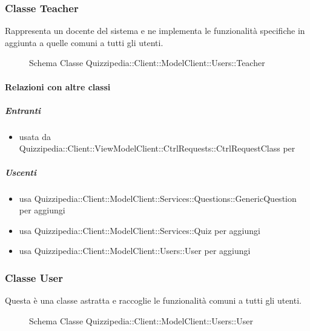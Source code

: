 \subsubsection{Classe Teacher}
Rappresenta un docente del sistema e ne implementa le funzionalità specifiche in aggiunta a quelle comuni a tutti gli utenti.
\begin{figure}[H]
\centering
\noindent{}
\caption[Schema Classe Teacher]{Schema Classe Quizzipedia::Client::ModelClient::Users::Teacher}
\end{figure}
\paragraph{Relazioni con altre classi}
\subparagraph{Entranti}
\begin{itemize}
\item usata da Quizzipedia::Client::ViewModelClient::CtrlRequests::CtrlRequestClass per 
\end{itemize}
\subparagraph{Uscenti}
\begin{itemize}
\item usa Quizzipedia::Client::ModelClient::Services::Questions::GenericQuestion per aggiungi
\item usa Quizzipedia::Client::ModelClient::Services::Quiz per aggiungi
\item usa Quizzipedia::Client::ModelClient::Users::User per aggiungi
\end{itemize}
\subsubsection{Classe User}
Questa è una classe astratta e raccoglie le funzionalità comuni a tutti gli utenti.
\begin{figure}[H]
\centering
\noindent{}
\caption[Schema Classe User]{Schema Classe Quizzipedia::Client::ModelClient::Users::User}
\end{figure}
